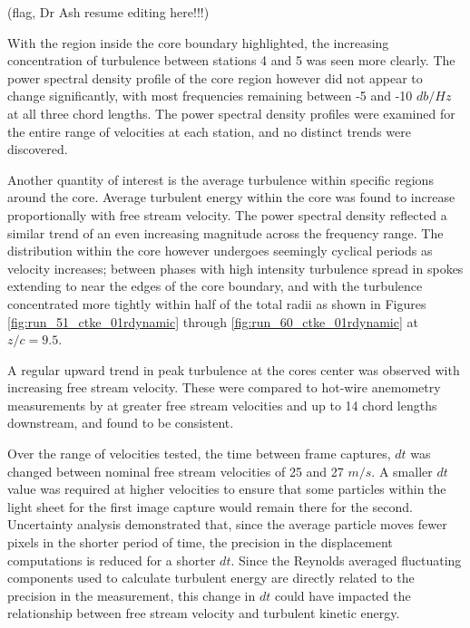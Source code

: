 \huge(flag, Dr Ash resume editing here!!!)\normalsize





With the region inside the core boundary highlighted, the increasing
concentration of turbulence between stations 4 and 5 was seen more clearly. The 
power spectral density profile of the core region however did not appear to 
change significantly, with most frequencies remaining between -5 and -10 
$db/Hz$ at all three chord lengths. The power spectral density profiles were 
examined for the entire range of velocities at each station, and no distinct 
trends were discovered. 





Another quantity of interest is the average turbulence within specific regions 
around the core. Average turbulent energy within the core was found to increase 
proportionally with free stream velocity. The power spectral density reflected 
a similar trend of an even increasing magnitude across the frequency range. The 
distribution within the core however undergoes seemingly cyclical periods as 
velocity increases; between phases with high intensity turbulence spread in 
spokes extending to near the edges of the core boundary, and with the 
turbulence concentrated more tightly within half of the total radii as shown in 
Figures \ref{fig:run_51_ctke_01rdynamic} through 
\ref{fig:run_60_ctke_01rdynamic} at $z/c = 9.5$.












A regular upward trend in peak turbulence at the cores center was observed with 
increasing free stream velocity. These were compared to hot-wire anemometry 
measurements by \cite{thompson2016} at greater free stream velocities and up to 
14 chord lengths downstream, and found to be consistent.

Over the range of velocities tested, the time between frame captures, $dt$ was 
changed between nominal free stream velocities of 25 and 27 $m/s$. A smaller 
$dt$ value was required at higher velocities to ensure that some particles 
within the light sheet for the first image capture would remain there for the 
second. Uncertainty analysis demonstrated that, since the average particle 
moves fewer pixels in the shorter period of time, the precision in the 
displacement computations is reduced for a shorter $dt$. Since the Reynolds 
averaged fluctuating components used to calculate turbulent energy are directly 
related to the precision in the measurement, this change in $dt$ could have 
impacted the relationship between free stream velocity and turbulent kinetic 
energy.

